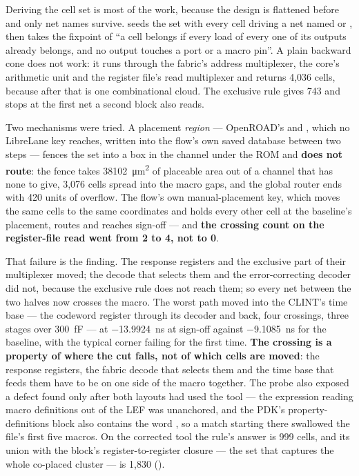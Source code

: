 Deriving the cell set is most of the work, because the design is
flattened before  and only net names survive.
 seeds the set with every cell driving a net
named  or , then takes the
fixpoint of ``a cell belongs if every load of every one of its outputs
already belongs, and no output touches a port or a macro pin''. A plain
backward cone does not work: it runs through the fabric's address
multiplexer, the core's arithmetic unit and the register file's read
multiplexer and returns 4,036 cells, because after  that is
one combinational cloud. The exclusive rule gives 743 and stops at the
first net a second block also reads.

Two mechanisms were tried. A placement \emph{region} --- OpenROAD's
 and , which no LibreLane key reaches,
written into the flow's own saved database between two steps --- fences
the set into a box in the channel under the ROM and \textbf{does not
route}: the fence takes \qty{38102}{\um\squared} of placeable
area out of a channel that has none to give, 3,076 cells spread into the
macro gaps, and the global router ends with 420 units of overflow. The flow's own manual-placement key, which moves
the same cells to the same coordinates and holds every other cell at the
baseline's placement, routes and reaches sign-off --- and \textbf{the
crossing count on the register-file read went from 2 to 4, not to 0}.

That failure is the finding. The response registers and the exclusive
part of their multiplexer moved; the decode that selects them and the
 error-correcting decoder did not, because the exclusive
rule does not reach them; so every net between the two halves now
crosses the macro. The worst path moved into the CLINT's time base ---
the codeword register through its decoder and back, four crossings,
three stages over \qty{300}{\femto\farad} --- at
\qty{-13.9924}{\nano\second} at sign-off against
\qty{-9.1085}{\nano\second} for the baseline, with the typical corner
failing for the first time. \textbf{The crossing is a property of where
the cut falls, not of which cells are moved}: the response registers,
the fabric decode that selects them and the time base that feeds them
have to be on one side of the macro together. The probe also exposed a
defect found only after both layouts had used the tool --- the
expression reading macro definitions out of the LEF was unanchored, and
the PDK's property-definitions block also contains the word
, so a match starting there swallowed the file's first five
macros. On the corrected tool the rule's answer is 999 cells, and its
union with the block's register-to-register closure --- the set that
captures the whole co-placed cluster --- is 1,830
().


